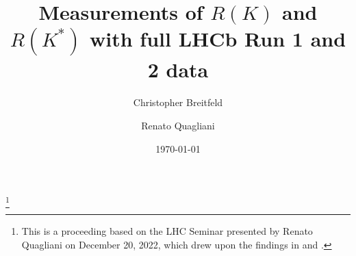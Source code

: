 




\title{Measurements of $R(K)$ and $R(K^*)$ with full LHCb Run 1 and 2 data}%
\thanks{This is a proceeding based on the LHC Seminar \cite{Seminar} presented by Renato Quagliani on December 20, 2022, which drew upon the findings in \cite{lhcbcollaboration2022measurement} and \cite{lhcbcollaboration2022test}.}

\author{Christopher Breitfeld}

\author{Renato Quagliani}

\date{\today}



\maketitle








